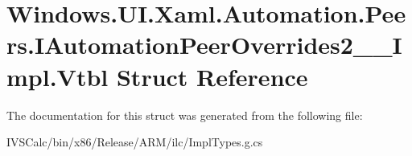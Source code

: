 \hypertarget{struct_windows_1_1_u_i_1_1_xaml_1_1_automation_1_1_peers_1_1_i_automation_peer_overrides2_____impl_1_1_vtbl}{}\section{Windows.\+U\+I.\+Xaml.\+Automation.\+Peers.\+I\+Automation\+Peer\+Overrides2\+\_\+\+\_\+\+Impl.\+Vtbl Struct Reference}
\label{struct_windows_1_1_u_i_1_1_xaml_1_1_automation_1_1_peers_1_1_i_automation_peer_overrides2_____impl_1_1_vtbl}


The documentation for this struct was generated from the following file\+:\begin{DoxyCompactItemize}
\item 
I\+V\+S\+Calc/bin/x86/\+Release/\+A\+R\+M/ilc/Impl\+Types.\+g.\+cs\end{DoxyCompactItemize}
